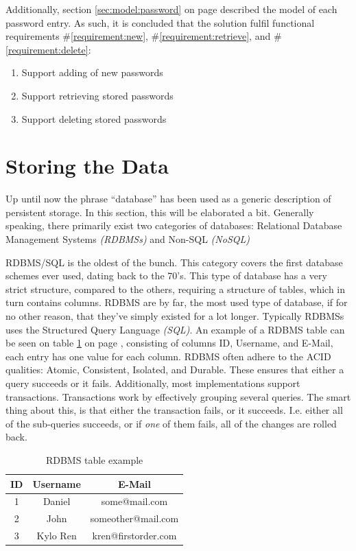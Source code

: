 			Additionally, section \ref{sec:model:password} on page \pageref{fig:model:password} described the model of each password entry. As such, it is concluded that the solution fulfil functional requirements \#\ref{requirement:new}, \#\ref{requirement:retrieve}, and \#\ref{requirement:delete}:
			\vspace{-3ex}\begin{enumerate}
				\setlength\itemsep{0.1em}
				\setcounter{enumi}{10-1}
				\item Support adding of new passwords
				\item Support retrieving stored passwords
				\item Support deleting stored passwords
			\end{enumerate}
	
	\section{Storing the Data}
		Up until now the phrase ``database'' has been used as a generic description of persistent storage. In this section, this will be elaborated a bit. Generally speaking, there primarily exist two categories of databases: Relational Database Management Systems \emph{(RDBMSs)} and Non-SQL \emph{(NoSQL)}

		RDBMS/SQL is the oldest of the bunch. This category covers the first database schemes ever used, dating back to the 70's. This type of database has a very strict structure, compared to the others, requiring a structure of tables, which in turn contains columns. RDBMS are by far, the most used type of database, if for no other reason, that they've simply existed for a lot longer. Typically RDBMSs uses the Structured Query Language \emph{(SQL)}. An example of a RDBMS table can be seen on table \ref{fig:example:rldb} on page \pageref{fig:example:rldb}, consisting of columns ID, Username, and E-Mail, each entry has one value for each column. RDBMS often adhere to the ACID qualities: Atomic, Consistent, Isolated, and Durable. These ensures that either a query succeeds or it fails. Additionally, most implementations support transactions. Transactions work by effectively grouping several queries. The smart thing about this, is that either the transaction fails, or it succeeds. I.e. either all of the sub-queries succeeds, or if \emph{one} of them fails, all of the changes are rolled back.

		\begin{table}[h!]
			\centering
			\begin{tabular}{|c|c|c|}
				\hline
				\textbf{ID} 		& 	\textbf{Username} 		& \textbf{E-Mail} 		\\
				\hline
				1 					& Daniel 					& some@mail.com 		\\
				\hline
				2 					& John 						& someother@mail.com 	\\
				\hline
				3 					& Kylo Ren 					& kren@firstorder.com 	\\
				\hline
			\end{tabular}
			\caption{RDBMS table example}
			\label{fig:example:rldb}
		\end{table}


